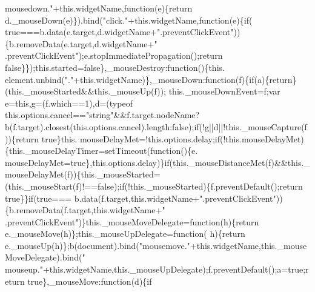 \begin{DoxyCode}
{      mousedown."}+this.widgetName,\textcolor{keyword}{function}(e)\{\textcolor{keywordflow}{return} d.\_mouseDown(e)\}).bind(\textcolor{stringliteral}{"click."}+this.widgetName,\textcolor{keyword}{function}(e)\{\textcolor{keywordflow}{if}(\textcolor{keyword}{
      true}===b.data(e.target,d.widgetName+\textcolor{stringliteral}{".preventClickEvent"}))\{b.removeData(e.target,d.widgetName+\textcolor{stringliteral}{"
      .preventClickEvent"});e.stopImmediatePropagation();\textcolor{keywordflow}{return} \textcolor{keyword}{false}\}\});this.started=\textcolor{keyword}{false}\},\_mouseDestroy:\textcolor{keyword}{function}()\{this.
      element.unbind(\textcolor{stringliteral}{"."}+this.widgetName)\},\_mouseDown:\textcolor{keyword}{function}(f)\{\textcolor{keywordflow}{if}(a)\{\textcolor{keywordflow}{return}\}(this.\_mouseStarted&&this.\_mouseUp(f));
      this.\_mouseDownEvent=f;var e=\textcolor{keyword}{this},g=(f.which==1),d=(typeof this.options.cancel==\textcolor{stringliteral}{"string"}&&f.target.nodeName?
      b(f.target).closest(this.options.cancel).length:\textcolor{keyword}{false});\textcolor{keywordflow}{if}(!g||d||!this.\_mouseCapture(f))\{\textcolor{keywordflow}{return} \textcolor{keyword}{true}\}this.
      mouseDelayMet=!this.options.delay;\textcolor{keywordflow}{if}(!this.mouseDelayMet)\{this.\_mouseDelayTimer=setTimeout(\textcolor{keyword}{function}()\{e.
      mouseDelayMet=\textcolor{keyword}{true}\},this.options.delay)\}\textcolor{keywordflow}{if}(this.\_mouseDistanceMet(f)&&this.\_mouseDelayMet(f))\{this.\_mouseStarted=
      (this.\_mouseStart(f)!==\textcolor{keyword}{false});\textcolor{keywordflow}{if}(!this.\_mouseStarted)\{f.preventDefault();\textcolor{keywordflow}{return} \textcolor{keyword}{true}\}\}\textcolor{keywordflow}{if}(\textcolor{keyword}{true}===
      b.data(f.target,\textcolor{keyword}{this}.widgetName+\textcolor{stringliteral}{".preventClickEvent"}))\{b.removeData(f.target,\textcolor{keyword}{this}.widgetName+\textcolor{stringliteral}{"
      .preventClickEvent"})\}this.\_mouseMoveDelegate=\textcolor{keyword}{function}(h)\{\textcolor{keywordflow}{return} e.\_mouseMove(h)\};this.\_mouseUpDelegate=\textcolor{keyword}{function}(
      h)\{\textcolor{keywordflow}{return} e.\_mouseUp(h)\};b(document).bind(\textcolor{stringliteral}{"mousemove."}+this.widgetName,this.\_mouseMoveDelegate).bind(\textcolor{stringliteral}{"
      mouseup."}+this.widgetName,this.\_mouseUpDelegate);f.preventDefault();a=\textcolor{keyword}{true};\textcolor{keywordflow}{return} \textcolor{keyword}{true}\},\_mouseMove:\textcolor{keyword}{function}(d)\{\textcolor{keywordflow}{if}

\end{DoxyCode}
